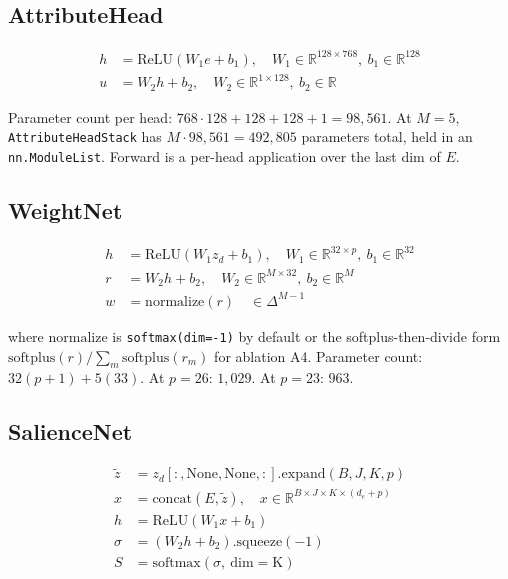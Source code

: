 \documentclass[11pt,a4paper]{article}
\begin{document}
\subsection{AttributeHead}

\begin{equation}
\begin{aligned}
  h &= \mathrm{ReLU}(W_1 e + b_1), \quad W_1 \in \mathbb{R}^{128 \times 768},\ b_1 \in \mathbb{R}^{128} \\
  u &= W_2 h + b_2, \quad W_2 \in \mathbb{R}^{1 \times 128},\ b_2 \in \mathbb{R}
\end{aligned}
\label{eq:attr-head}
\end{equation}

Parameter count per head: $768 \cdot 128 + 128 + 128 + 1 = 98{,}561$.
At $M = 5$, \texttt{AttributeHeadStack} has $M \cdot 98{,}561 =
492{,}805$ parameters total, held in an \texttt{nn.ModuleList}. Forward
is a per-head application over the last dim of $E$.

\subsection{WeightNet}

\begin{equation}
\begin{aligned}
  h &= \mathrm{ReLU}(W_1 z_d + b_1), \quad W_1 \in \mathbb{R}^{32 \times p},\ b_1 \in \mathbb{R}^{32} \\
  r &= W_2 h + b_2, \quad W_2 \in \mathbb{R}^{M \times 32},\ b_2 \in \mathbb{R}^M \\
  w &= \mathrm{normalize}(r) \quad \in \Delta^{M-1}
\end{aligned}
\label{eq:weight-net}
\end{equation}

where $\mathrm{normalize}$ is \texttt{softmax(dim=-1)} by default or
the softplus-then-divide form
$\mathrm{softplus}(r) / \sum_m \mathrm{softplus}(r_m)$ for ablation
A4. Parameter count: $32(p+1) + 5(33)$. At $p = 26$: $1{,}029$. At
$p = 23$: $963$.

\subsection{SalienceNet}

\begin{equation}
\begin{aligned}
  \tilde{z} &= z_d[:, \text{None}, \text{None}, :].\mathrm{expand}(B, J, K, p) \\
  x &= \mathrm{concat}(E, \tilde{z}), \quad x \in \mathbb{R}^{B \times J \times K \times (d_e + p)} \\
  h &= \mathrm{ReLU}(W_1 x + b_1) \\
  \sigma &= (W_2 h + b_2).\mathrm{squeeze}(-1) \\
  S &= \mathrm{softmax}(\sigma,\ \mathrm{dim}=\mathrm{K})
\end{aligned}
\label{eq:salience}
\end{equation}
\end{document}
